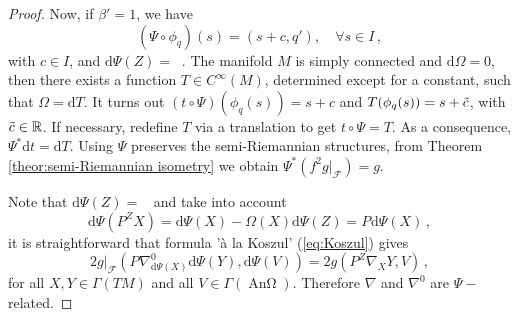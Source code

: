 \documentclass[12pt]{article}
\newcommand{\diff}{\mathrm{d}}
\newcommand{\dt}{\diff t}
\DeclareMathOperator{\pt}{\partial_t}
\DeclareMathOperator{\An}{\text{An}\Omega}
\def\R{\mathbb R}
\def\f{\mathcal F}
\begin{document}
\begin{proof}
    Now, if $\beta'=1$, we have 
    $$(\Psi \circ \phi_q)(s) = (s+c,q'),\quad \forall s\in I\,,$$ 
    with $c\in I$, and $\diff \Psi(Z) = \pt$. The manifold $M$ is simply connected and $\diff \Omega =0$, then there exists a function $T\in C^\infty(M)$, determined except for a constant, such that $\Omega=\diff T$. It turns out $(t\circ \Psi)(\phi_q(s)) = s+c$  and  $T(\phi_q(s)) = s+\Tilde{c}$, with $\Tilde{c}\in \R$. If necessary, redefine $T$ via a translation to get $t\circ \Psi = T$. As a consequence, $\Psi^* \dt = \diff T$. Using $\Psi$ preserves the semi-Riemannian structures, from Theorem \ref{theor:semi-Riemannian isometry} we obtain $\Psi^* (f^2 g|_{\f}) = g$.

    Note that $\diff \Psi(Z) = \pt$ and take into account 
    $$
    \diff\Psi(P^Z X) = \diff\Psi(X) - \Omega(X) \diff\Psi(Z) = P^{\pt} \diff\Psi(X)\,,
    $$
    it is straightforward that formula 'à la Koszul' (\ref{eq:Koszul}) gives 
    \[
        2 g|_\f (P^{\pt} \nabla^0_{\diff \Psi(X)} \diff \Psi(Y), \diff\Psi(V)) = 2 g(P^Z \nabla_X Y, V)\,,
    \]
    for all $X,Y\in \Gamma(TM)$ and all $V\in \Gamma(\An)$. Therefore $\nabla$ and $\nabla^0$ are $\Psi-$related.
\end{proof}
\end{document}
